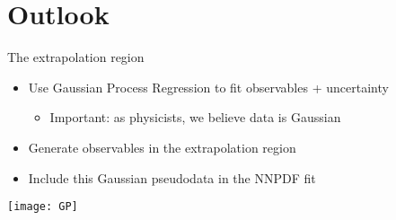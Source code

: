 \section{Outlook}
\begin{frame}{ The extrapolation region}

\vspace*{\titleskip}

\begin{itemize}
\item Use Gaussian Process Regression to fit observables + uncertainty

\begin{itemize}
\item Important: as physicists, we believe data is Gaussian
\end{itemize}
\item Generate observables in the extrapolation region
\item Include this Gaussian pseudodata in the NNPDF fit
\end{itemize}

\vspace*{\secondskip}


\begin{center}
\texttt{[image: GP]}
\end{center}


\end{frame}



%
%
%
%
%		
%		
%				
%	
%
%

